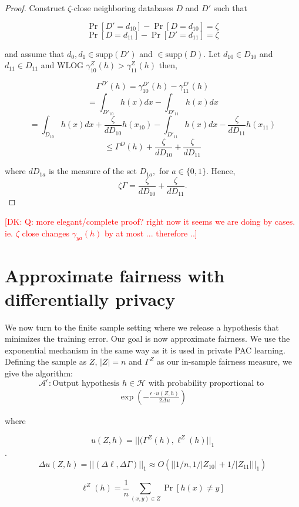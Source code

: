 \documentclass[format = sigconf]{acmart}
\newcommand{\dk}[1]{\textcolor{red}{[DK: #1]}}
\newcommand{\1}{\mathbbm{1}}
\newcommand{\eps}{\epsilon}
\newcommand{\zt}{\zeta}
\newcommand{\z}[1]{Z_{#1}}
\theoremstyle{definition}
\begin{document}
\begin{proof}
Construct $\zt$-close neighboring databases $D$ and $D'$ such that

$$\Pr[D'=d_{10}] - \Pr[D=d_{10}] = \zt$$
$$\Pr[D=d_{11}] - \Pr[D'=d_{11}] = \zt$$



and assume that $d_0, d_1 \in \text{supp}(D')$ and $\in \text{supp}(D)$. Let $d_{10} \in D_{10}$ and $d_{11} \in D_{11}$ and WLOG $\gamma_{10}^Z(h) > \gamma_{11}^Z(h)$ then,

$$\Gamma^{D'}(h) = \gamma_{10}^{D'}(h) - \gamma_{11}^{D'}(h)$$
$$= \int_{D'_{10}}h(x)dx - \int_{D'_{11}}h(x)dx$$
$$= \int_{D_{10}}h(x)dx + \frac{\zt}{dD_{10}}h(x_{10}) - \int_{D'_{11}}h(x)dx - \frac{\zt}{dD_{11}}h(x_{11})$$
$$\leq \Gamma^{D}(h) + \frac{\zt}{dD_{10}} + \frac{\zt}{dD_{11}}$$

where $dD_{1a}$ is the measure of the set $D_{1a},$ for $a \in \{0,1\}$. Hence,
$$\zt\Gamma = \frac{\zt}{dD_{10}} + \frac{\zt}{dD_{11}}.$$
\end{proof}

\dk{Q: more elegant/complete proof? right now it seems we are doing by cases. ie. $\zt$ close changes $\gamma_{ya}(h)$ by at most ... therefore ..}

\section{Approximate fairness with differentially privacy}



We now turn to the finite sample setting where we release a hypothesis that minimizes the training error. Our goal is now approximate fairness. We use the exponential mechanism in the same way as it is used in private PAC learning. Defining the sample as $Z$, $|Z| = n$ and $\Gamma^{Z}$ as our in-sample fairness measure, we give the algorithm:
$$\mathcal{A}^\eps : \text{Output hypothesis }h \in \mathcal{H} \text{ with probability proportional to }$$
\begin{align}
\exp(-\frac{\eps \cdot u(Z,h)}{2\Delta u})
\end{align}

where

$$u(Z,h) = ||(\Gamma^Z(h), \ell^Z(h)||_{1}$$.
$$\Delta u(Z,h) = ||(\Delta\ell,\Delta{\Gamma})||_1 \approx O(||1/n,1/|\z{10}|+1/|Z_{11}|||_1)$$

$$\ell^Z(h) = \frac{1}{n} \sum_{(x,y) \in Z}\Pr[h(x) \neq y]$$
\end{document}
